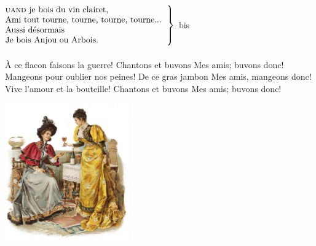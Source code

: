 
~\\
$\left.\begin{tabular}{l}
\hspace{-0.4cm}
\textsc{uand} je bois du vin clairet,
\\
\hspace{-0.4cm}
Ami tout tourne, tourne, tourne, tourne...
\\
\hspace{-0.4cm}
Aussi désormais 
\\
\hspace{-0.4cm}
Je bois Anjou ou Arbois.
\end{tabular}\right\rbrace$ bis\\\\
{À ce flacon faisons la guerre!}
{Chantons et buvons}
{Mes amis; buvons donc!}
{Mangeons pour oublier nos peines!}
{De ce gras jambon}
{Mes amis, mangeons donc!}
{Vive l'amour et la bouteille!}
{Chantons et buvons}
{Mes amis; buvons donc!}

\vspace{0.5cm}

\begin{center}
   \includegraphics[width=0.4\textwidth]{images/brev85.png}
 \end{center}
\breakpage